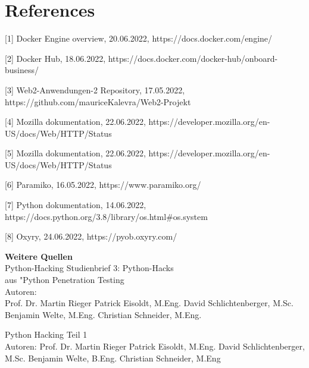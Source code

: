 \documentclass[12pt]{article}
\begin{document}
\section{References}
[1] Docker Engine overview, 20.06.2022, https://docs.docker.com/engine/

\vspace{4mm}


[2] Docker Hub, 18.06.2022, https://docs.docker.com/docker-hub/onboard-business/
\vspace{4mm}

[3] Web2-Anwendungen-2 Repository, 17.05.2022, https://github.com/mauriceKalevra/Web2-Projekt

\vspace{4mm}

[4] Mozilla dokumentation, 22.06.2022, https://developer.mozilla.org/en-US/docs/Web/HTTP/Status

\vspace{4mm}

[5] Mozilla dokumentation, 22.06.2022, https://developer.mozilla.org/en-US/docs/Web/HTTP/Status

\vspace{4mm}

[6] Paramiko, 16.05.2022, https://www.paramiko.org/

\vspace{4mm}

[7] Python dokumentation, 14.06.2022, https://docs.python.org/3.8/library/os.html\#os.system

[8] Oxyry, 24.06.2022, https://pyob.oxyry.com/

\vspace{4mm}

\textbf{Weitere Quellen}\\
Python-Hacking
Studienbrief 3: Python-Hacks\\
aus "Python Penetration Testing\\
Autoren:\\
Prof. Dr. Martin Rieger
Patrick Eisoldt, M.Eng.
David Schlichtenberger, M.Sc.
Benjamin Welte, M.Eng.
Christian Schneider, M.Eng.
\vspace{4mm}

Python Hacking
Teil 1\\
Autoren:
Prof. Dr. Martin Rieger
Patrick Eisoldt, M.Eng.
David Schlichtenberger, M.Sc.
Benjamin Welte, B.Eng.
Christian Schneider, M.Eng
\end{document}
